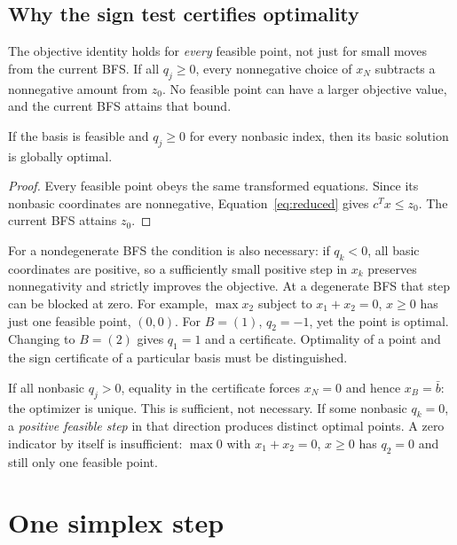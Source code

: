 \documentclass[11pt,a4paper]{article}
\begin{document}
\subsection{Why the sign test certifies optimality}
The objective identity holds for \emph{every} feasible point, not just for
small moves from the current BFS. If all $q_j\geq0$, every nonnegative
choice of $x_N$ subtracts a nonnegative amount from $z_0$. No feasible point
can have a larger objective value, and the current BFS attains that bound.
\begin{lecturecore}
  \begin{proposition}\label{prop:certificate}
    If the basis is feasible and $q_j\geq0$ for every nonbasic index, then its
    basic solution is globally optimal.
  \end{proposition}
\end{lecturecore}
\begin{proof}
  Every feasible point obeys the same transformed equations. Since its
  nonbasic coordinates are nonnegative, Equation~\eqref{eq:reduced} gives
  $c^Tx\leq z_0$. The current BFS attains $z_0$.
\end{proof}
For a nondegenerate BFS the condition is also necessary: if $q_k<0$, all
basic coordinates are positive, so a sufficiently small positive step in
$x_k$ preserves nonnegativity and strictly improves the objective.
At a degenerate BFS that step can be blocked at zero. For example,
$\max x_2$ subject to $x_1+x_2=0$, $x\geq0$ has just one feasible point,
$(0,0)$. For $B=(1)$, $q_2=-1$, yet the point is optimal. Changing to
$B=(2)$ gives $q_1=1$ and a certificate. Optimality of a point and the sign
certificate of a particular basis must be distinguished.

If all nonbasic $q_j>0$, equality in the certificate forces $x_N=0$ and hence
$x_B=\bar b$: the optimizer is unique. This is sufficient, not necessary.
If some nonbasic $q_k=0$, a \emph{positive feasible step} in that direction
produces distinct optimal points. A zero indicator by itself is insufficient:
$\max0$ with $x_1+x_2=0$, $x\geq0$ has $q_2=0$ and still only one feasible point.

\section{One simplex step}\label{sec:pivot}
\end{document}
